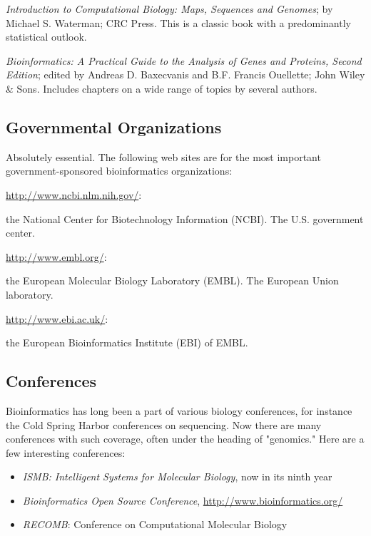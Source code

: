 \textit{Introduction to Computational Biology: Maps, Sequences and Genomes}; by Michael S. Waterman; CRC Press. This is a classic book with a predominantly statistical outlook.

\textit{Bioinformatics: A Practical Guide to the Analysis of Genes and Proteins, Second Edition}; edited by Andreas D. Baxecvanis and B.F. Francis Ouellette; John Wiley \& Sons. Includes chapters on a wide range of topics by several authors.

\subsection{Governmental Organizations}
Absolutely essential. The following web sites are for the most important government-sponsored bioinformatics organizations:

\href{http://www.ncbi.nlm.nih.gov/}{http://www.ncbi.nlm.nih.gov/}:

\begin{adjustwidth}{1cm}{}
the National Center for Biotechnology Information (NCBI). The U.S. government center.
\end{adjustwidth}

\href{http://www.embl.org/}{http://www.embl.org/}:

\begin{adjustwidth}{1cm}{}
the European Molecular Biology Laboratory (EMBL). The European Union laboratory.
\end{adjustwidth}

\href{http://www.ebi.ac.uk/}{http://www.ebi.ac.uk/}:

\begin{adjustwidth}{1cm}{}
the European Bioinformatics Institute (EBI) of EMBL.
\end{adjustwidth}

\subsection{Conferences}
Bioinformatics has long been a part of various biology conferences, for instance the Cold Spring Harbor conferences on sequencing. Now there are many conferences with such coverage, often under the heading of "genomics." Here are a few interesting conferences:

\begin{itemize}
  \item \textit{ISMB: Intelligent Systems for Molecular Biology}, now in its ninth year
  \item \textit{Bioinformatics Open Source Conference}, \href{http://www.bioinformatics.org/}{http://www.bioinformatics.org/}
  \item \textit{RECOMB}: Conference on Computational Molecular Biology
\end{itemize}

